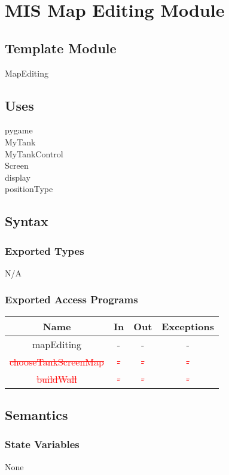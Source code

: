 \documentclass[12pt, titlepage]{article}
\begin{document}
\section{MIS Map Editing Module}
        \subsection{Template Module}
        MapEditing
        \subsection{Uses}
        pygame\\
        MyTank\\
        MyTankControl\\
        Screen\\
        display\\
        positionType\\
		\subsection{Syntax}
		\subsubsection{Exported Types}
		N/A
		\subsubsection{Exported Access Programs}
				\begin{tabular}[pos]{|c|c|c|c|}
					
					\hline
					\textbf{Name}& \textbf{In} & \textbf{Out} & \textbf{Exceptions} \\ \hline
					mapEditing & - & - & -\\ \hline
					\textcolor{red}{\sout{chooseTankScreenMap}} & \textcolor{red}{\sout{-}} & \textcolor{red}{\sout{-}} & \textcolor{red}{\sout{-}}\\ \hline
					\textcolor{red}{\sout{buildWall}} & \textcolor{red}{\sout{-}} & \textcolor{red}{\sout{-}} & \textcolor{red}{\sout{-}}\\ \hline
					
				\end{tabular}

		
		\subsection{Semantics}
		\subsubsection{State Variables}
		None
		
\end{document}
